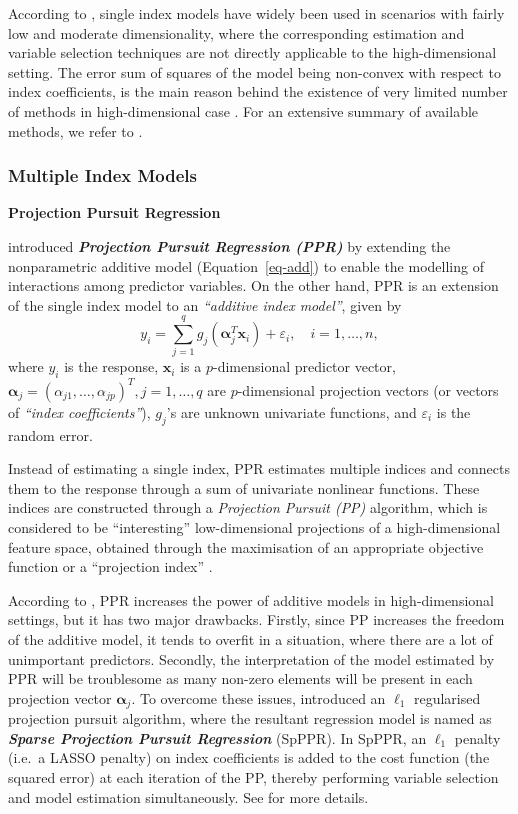 \documentclass[11pt,a4paper,]{article}
\begin{document}
According to \textcite{Radchenko2015}, single index models have widely
been used in scenarios with fairly low and moderate dimensionality,
where the corresponding estimation and variable selection techniques are
not directly applicable to the high-dimensional setting. The error sum
of squares of the model being non-convex with respect to index
coefficients, is the main reason behind the existence of very limited
number of methods in high-dimensional case \autocite{Radchenko2015}. For
an extensive summary of available methods, we refer to
\textcite{Radchenko2015}.

\hypertarget{sec-multi-index}{%
\subsubsection{Multiple Index Models}\label{sec-multi-index}}

\textbf{Projection Pursuit Regression}

\textcite{Friedman1981} introduced \textbf{\emph{Projection Pursuit
Regression (PPR)}} by extending the nonparametric additive model
(Equation~\ref{eq-add}) to enable the modelling of interactions among
predictor variables. On the other hand, PPR is an extension of the
single index model to an \emph{``additive index model''}, given by \[
  y_{i} = \sum_{j=1}^{q} {g_{j}(\bm{\alpha}_{j}^{T}\bm{x}_{i})} + \varepsilon_{i}, \quad i = 1, \dots, n,
\] where \(y_{i}\) is the response, \(\bm{x}_{i}\) is a
\(p\)-dimensional predictor vector,
\(\bm{\alpha}_{j} = \left ( \alpha_{j1}, \dots, \alpha_{jp} \right )^{T}, j = 1, \dots, q\)
are \(p\)-dimensional projection vectors (or vectors of \emph{``index
coefficients''}), \(g_{j}\)'s are unknown univariate functions, and
\(\varepsilon_{i}\) is the random error.

Instead of estimating a single index, PPR estimates multiple indices and
connects them to the response through a sum of univariate nonlinear
functions. These indices are constructed through a \emph{Projection
Pursuit (PP)} \autocite{Kruskal1969,Friedman1974} algorithm, which is
considered to be ``interesting'' low-dimensional projections of a
high-dimensional feature space, obtained through the maximisation of an
appropriate objective function or a ``projection index''
\autocite{Huber1985}.

According to \textcite{Zhang2008}, PPR increases the power of additive
models in high-dimensional settings, but it has two major drawbacks.
Firstly, since PP increases the freedom of the additive model, it tends
to overfit in a situation, where there are a lot of unimportant
predictors. Secondly, the interpretation of the model estimated by PPR
will be troublesome as many non-zero elements will be present in each
projection vector \(\bm{\alpha}_{j}\). To overcome these issues,
\textcite{Zhang2008} introduced an \(\ell_{1}\) regularised projection
pursuit algorithm, where the resultant regression model is named as
\textbf{\emph{Sparse Projection Pursuit Regression}} (SpPPR). In SpPPR,
an \(\ell_{1}\) penalty (i.e.~a LASSO penalty) on index coefficients is
added to the cost function (the squared error) at each iteration of the
PP, thereby performing variable selection and model estimation
simultaneously. See \textcite{Zhang2008} for more details.
\end{document}
